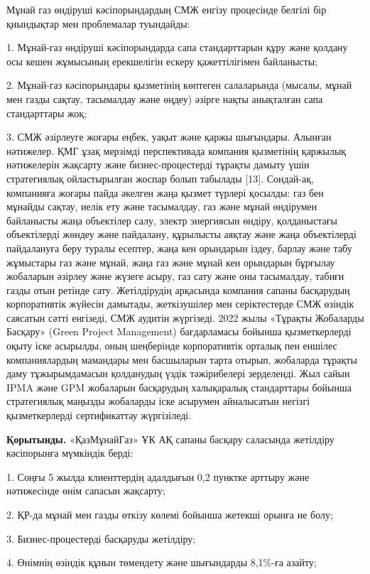 Мұнай газ өндіруші кәсіпорындардың СМЖ енгізу процесінде белгілі бір
қиындықтар мен проблемалар туындайды:

1. Мұнай-газ өндіруші кәсіпорындарда сапа стандарттарын құру және
қолдану осы кешен жұмысының ерекшелігін ескеру қажеттілігімен
байланысты;

2. Мұнай-газ кәсіпорындары қызметінің көптеген салаларында (мысалы,
мұнай мен газды сақтау, тасымалдау және өңдеу) әзірге нақты анықталған
сапа стандарттары жоқ;

3. СМЖ әзірлеуге жоғары еңбек, уақыт және қаржы шығындары. Алынған
нәтижелер. ҚМГ ұзақ мерзімді перспективада компания қызметінің қаржылық
нәтижелерін жақсарту және бизнес-процестерді тұрақты дамыту үшін
стратегиялық ойластырылған жоспар болып табылады {[}13{]}. Сондай-ақ,
компанияға жоғары пайда әкелген жаңа қызмет түрлері қосылды: газ бен
мұнайды сақтау, иелік ету және тасымалдау, газ және мұнай өндірумен
байланысты жаңа объектілер салу, электр энергиясын өндіру, қолданыстағы
объектілерді жөндеу және пайдалану, құрылысты аяқтау және жаңа
объектілерді пайдалануға беру туралы есептер, жаңа кен орындарын іздеу,
барлау және табу жұмыстары газ және мұнай, жаңа газ және мұнай кен
орындарын бұрғылау жобаларын әзірлеу және жүзеге асыру, газ сату және
оны тасымалдау, табиғи газды отын ретінде сату. Жетілдірудің арқасында
компания сапаны басқарудың корпоративтік жүйесін дамытады, жеткізушілер
мен серіктестерде СМЖ өзіндік саясатын сәтті енгізеді, СМЖ аудитін
жүргізеді. 2022 жылы «Тұрақты Жобаларды Басқару» (Green Project
Management) бағдарламасы бойынша қызметкерлерді оқыту іске асырылды,
оның шеңберінде корпоративтік орталық пен еншілес компаниялардың
мамандары мен басшыларын тарта отырып, жобаларда тұрақты даму
тұжырымдамасын қолданудың үздік тәжірибелері зерделенді. Жыл сайын IPMA
және GPM жобаларын басқарудың халықаралық стандарттары бойынша
стратегиялық маңызды жобаларды іске асырумен айналысатын негізгі
қызметкерлерді сертификаттау жүргізіледі.

{\bfseries Қорытынды.} «ҚазМұнайГаз» ҰК АҚ сапаны басқару саласында
жетілдіру кәсіпорынға мүмкіндік берді:

1. Соңғы 5 жылда клиенттердің адалдығын 0,2 пунктке арттыру және
нәтижесінде өнім сапасын жақсарту;

2. ҚР-да мұнай мен газды өткізу көлемі бойынша жетекші орынға ие болу;

3. Бизнес-процестерді басқаруды жетілдіру;

4. Өнімнің өзіндік құнын төмендету және шығындарды 8,1\%-ға азайту;

